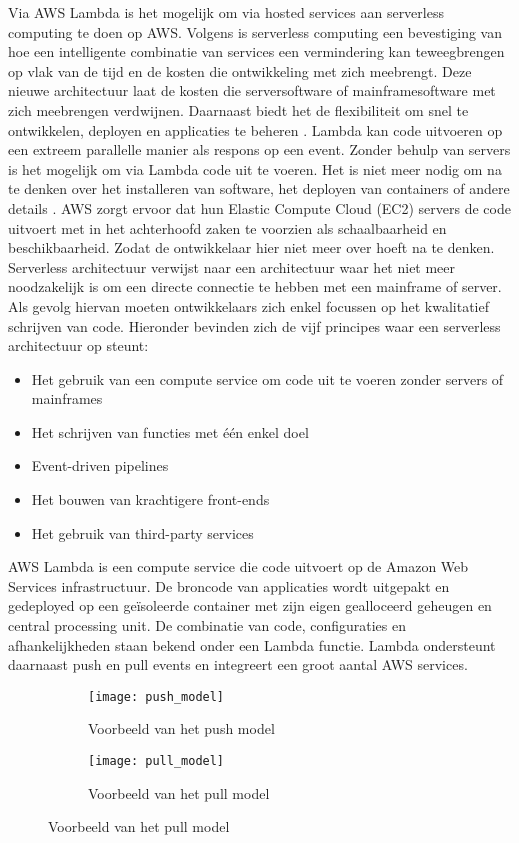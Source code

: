Via AWS Lambda is het mogelijk om via hosted services aan serverless computing te doen op AWS. Volgens \textcite{Sbarski2017} is serverless computing een bevestiging van hoe een intelligente combinatie van services een vermindering kan teweegbrengen op vlak van de tijd en de kosten die ontwikkeling met zich meebrengt. Deze nieuwe architectuur laat de kosten die serversoftware of mainframesoftware met zich meebrengen verdwijnen. Daarnaast biedt het de flexibiliteit om snel te ontwikkelen, deployen en applicaties te beheren \autocite{Sbarski2017}. Lambda kan code uitvoeren op een extreem parallelle manier als respons op een event. Zonder behulp van servers is het mogelijk om via Lambda code uit te voeren. Het is niet meer nodig om na te denken over het installeren van software, het deployen van containers of andere details \autocite{Sbarski2017}. AWS zorgt ervoor dat hun Elastic Compute Cloud (EC2) servers de code uitvoert met in het achterhoofd zaken te voorzien als schaalbaarheid en beschikbaarheid. Zodat de ontwikkelaar hier niet meer over hoeft na te denken. Serverless architectuur verwijst naar een architectuur waar het niet meer noodzakelijk is om een directe connectie te hebben met een mainframe of server. Als gevolg hiervan moeten ontwikkelaars zich enkel focussen op het kwalitatief schrijven van code. Hieronder bevinden zich de vijf principes waar een serverless architectuur op steunt:
 \begin{itemize}
    \item Het gebruik van een compute service om code uit te voeren zonder servers of mainframes
    \item Het schrijven van functies met één enkel doel
    \item Event-driven pipelines
    \item Het bouwen van krachtigere front-ends
    \item Het gebruik van third-party services
\end{itemize}

AWS Lambda is een compute service die code uitvoert op de Amazon Web Services infrastructuur. De broncode van applicaties wordt uitgepakt en gedeployed op een geïsoleerde container met zijn eigen gealloceerd geheugen en central processing unit. De combinatie van code, configuraties en afhankelijkheden staan bekend onder een Lambda functie. Lambda ondersteunt daarnaast push en pull events en integreert een groot aantal AWS services. 
\begin{figure}[h]
    \centering
    \begin{subfigure}{0.45\textwidth}
        \texttt{[image: push\_model]}
        \caption{Voorbeeld van het push model \autocite{Sbarski2017}}
    \end{subfigure}
    \hfill
    \begin{subfigure}{0.45\textwidth}
        \texttt{[image: pull\_model]}
        \caption{Voorbeeld van het pull model \autocite{Sbarski2017}}
    \end{subfigure}
\end{figure}

